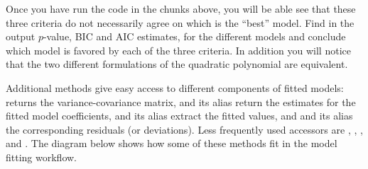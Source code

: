 \documentclass[krantz2]{krantz}\usepackage{knitr}
\begin{document}
\begin{playground}
\begin{knitrout}\footnotesize
{}\color{fgcolor}\begin{kframe}
\begin{alltt}
\end{alltt}
\end{kframe}
\end{knitrout}

Once you have run the code in the chunks above, you will be able see that these three criteria do not necessarily agree on which is the ``best'' model. Find in the output $p$-value, BIC and AIC estimates, for the different models and conclude which model is favored by each of the three criteria. In addition you will notice that the two different formulations of the quadratic polynomial are equivalent.

\end{playground}

Additional methods give easy access to different components of fitted models:  returns the variance-covariance matrix,  and its alias  return the estimates for the fitted model coefficients,  and its alias  extract the fitted values, and  and its alias  the corresponding residuals (or deviations). Less frequently used accessors are , , ,  and . The diagram below shows how some of these methods fit in the model fitting workflow.
\end{document}

